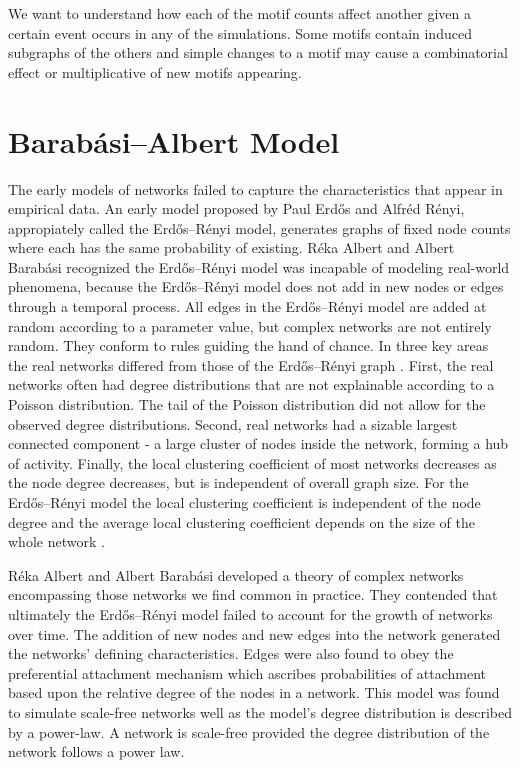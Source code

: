 We want to understand how each of the motif counts affect another given a certain event occurs
in any of the simulations. Some motifs contain induced subgraphs of the others and simple changes
to a motif may cause a combinatorial effect or multiplicative of new motifs appearing.

\chapter{Barabási–Albert Model}
\label{section:BA model}
The early models of networks failed to capture the characteristics that appear in empirical data. An
early model proposed by Paul Erdős and Alfréd Rényi, appropiately called the Erdős–Rényi model, generates
graphs of fixed node counts where each has the same probability of existing. 
Réka Albert and Albert Barabási recognized the Erdős–Rényi model 
was incapable of modeling real-world phenomena, because the Erdős–Rényi model does not add
in new nodes or edges through a temporal process. All edges in the Erdős–Rényi model are added at random
according to a parameter value, but complex networks are not entirely random.
They conform to rules guiding the hand of chance. 
In three key areas the real networks differed from those
of the Erdős–Rényi graph \cite{barabasi2016network}.
 First, the real networks often had degree distributions 
that are not explainable according to a Poisson distribution.
 The tail of the Poisson
distribution did not allow for the observed degree distributions.
Second, real networks had a sizable largest connected component - a large cluster 
of nodes inside the network, forming a hub of activity.
 Finally, the local clustering coefficient of most networks
decreases as the node degree decreases,
 but is independent of overall graph size. For the Erdős–Rényi model
the local clustering coefficient is independent of the node degree and the average local clustering coefficient
depends on the size of the whole network \cite{barabasi2016network}.

Réka Albert and Albert Barabási developed a theory of complex networks 
encompassing those networks we find common in practice. They contended that ultimately the 
Erdős–Rényi model failed to account for the growth of networks over time. The addition
of new nodes and new edges into the network generated the networks' defining characteristics.
Edges were also found to obey the preferential attachment
mechanism which ascribes probabilities of attachment based upon the relative degree of the nodes in a network. 
This model was found to simulate scale-free networks well as the model's
degree distribution is described by a power-law. 
A network is scale-free provided the degree distribution of the network follows a power law. 


